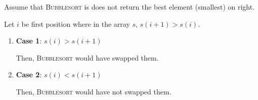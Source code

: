 \begin{example}
    Assume that \textsc{Bubblesort} is does not return the best element (smallest) on right. 

    Let $i$ be first position where in the array $s$, $s(i + 1) > s(i)$.

    \begin{enumerate}
        \item \textbf{Case 1}: $s(i) > s(i+1)$
        
        Then, \textsc{Bubblesort} would have swapped them. 

        \item \textbf{Case 2}: $s(i) < s(i+1)$
        
        Then, \textsc{Bubblesort} would have not swapped them.
    \end{enumerate}
\end{example}